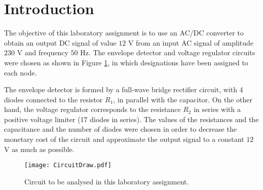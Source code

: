 \section{Introduction} \label{sec:introduction}

The objective of this laboratory assignment is to use an AC/DC converter to obtain an output DC signal of value $12$ V from an input AC signal of amplitude $230$ V and frequency $50$ Hz. The envelope detector and voltage regulator circuits were chosen as shown in Figure \ref{fig:CircuitDraw}, in which designations have been assigned to each node.
\par
The envelope detector is formed by a full-wave bridge rectifier circuit, with 4 diodes connected to the resistor $R_1$, in parallel with the capacitor. On the other hand, the voltage regulator corresponds to the resistance $R_2$ in series with a positive voltage limiter (17 diodes in series). The values of the resistances and the capacitance and the number of diodes were chosen in order to decrease the monetary cost of the circuit and approximate the output signal to a constant $12$ V as much as possible.

\begin{figure}[H] \centering
  \texttt{[image: CircuitDraw.pdf]}
  \caption{Circuit to be analysed in this laboratory assignment.}
  \label{fig:CircuitDraw}
\end{figure}

